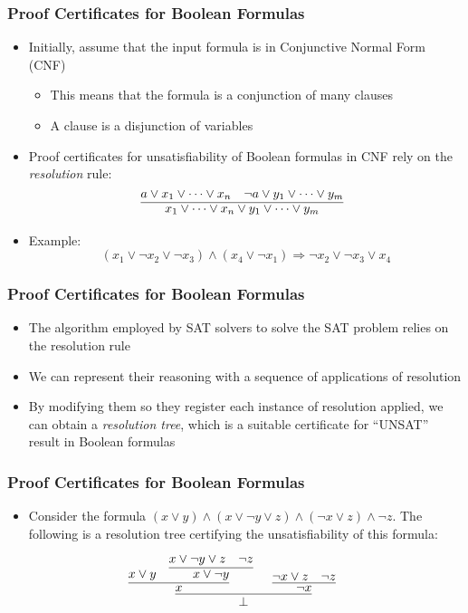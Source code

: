 \documentclass[usepdftitle=false,aspectratio=169,usenames,dvipsnames]{beamer}
\newcommand\vitem{\vfill\item}
\begin{document}
\begin{frame}
  \frametitle{Proof Certificates for Boolean Formulas}
    \begin{itemize}
    \item Initially, assume that the input formula is in Conjunctive Normal Form (CNF)
    \begin{itemize}
      \item This means that the formula is a conjunction of many clauses
      \item A clause is a disjunction of variables
    \end{itemize}
    \vitem Proof certificates for unsatisfiability of Boolean formulas in CNF rely on the \textit{resolution} rule:
          \vfill
  \[
    \infer[]{x_{1} \vee \cdots \vee x_{n} \vee y_{1} \vee \cdots \vee y_{m}}{a \vee x_{1} \vee \cdots \vee x_{n} & \neg a \vee y_{1} \vee \cdots \vee y_{m}}
  \]
  \vitem Example:
            \vfill
          $$ (x_{1} \vee \neg x_{2} \vee \neg x_{3}) \wedge (x_{4} \vee \neg x_{1}) \Rightarrow \neg x_{2} \vee \neg x_{3} \vee x_{4} $$
   \end{itemize}
\end{frame}

\begin{frame}
  \frametitle{Proof Certificates for Boolean Formulas}
  \begin{itemize}
    \item The algorithm employed by SAT solvers to solve the SAT problem relies on the resolution rule
    \vitem We can represent their reasoning with a sequence of applications of resolution
    \vitem By modifying them so they register each instance of resolution applied, we can obtain a \textit{resolution tree}, which is a suitable certificate for ``UNSAT'' result in Boolean formulas
  \end{itemize}
\end{frame}
\begin{frame}
  \frametitle{Proof Certificates for Boolean Formulas}
  \begin{itemize}
    \item Consider the formula $(x \vee y) \wedge (x \vee \neg y \vee z) \wedge (\neg x \vee z) \wedge  \neg z$. The following is a resolution tree certifying the unsatisfiability of this formula:
  \end{itemize}
  \vfill
  \[
\infer[]{\bot}{
  \infer[]
  {x}
  {x \vee y & \infer[]{x \vee \neg y}{x \vee \neg y \vee z & \neg z}} & \infer[]{\neg x}{\neg x \vee z & \neg z}}
\]
\end{frame}
\end{document}
